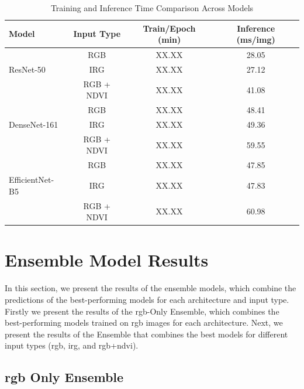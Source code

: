 \begin{table}[H]
    \centering
    \renewcommand{\arraystretch}{1.2}
    \setlength{\tabcolsep}{12pt}
    \begin{tabular}{@{}lccc@{}}
        \toprule
        \textbf{Model} & \textbf{Input Type} & \textbf{Train/Epoch (min)} & \textbf{Inference (ms/img)} \\ \midrule
        & RGB             & XX.XX & 28.05 \\
        ResNet-50       & IRG             & XX.XX & 27.12 \\
        & RGB + NDVI      & XX.XX & 41.08 \\
        
        \midrule
        
        & RGB             & XX.XX & 48.41 \\
        DenseNet-161    & IRG             & XX.XX & 49.36 \\
        & RGB + NDVI      & XX.XX & 59.55 \\
        
        \midrule
        
        & RGB             & XX.XX & 47.85 \\
        EfficientNet-B5 & IRG             & XX.XX & 47.83 \\
        & RGB + NDVI      & XX.XX & 60.98 \\
        \bottomrule
    \end{tabular}
    \caption{Training and Inference Time Comparison Across Models}
    \label{tab:training_times}
\end{table}


\section{Ensemble Model Results}

In this section, we present the results of the ensemble models, which combine the predictions of
the best-performing models for each architecture and input type. Firstly we present the results of the
\gls{rgb}-Only Ensemble, which combines the best-performing models trained on \gls{rgb} images for each architecture.
Next, we present the results of the Ensemble that combines the best models for different input
types (\gls{rgb}, \gls{irg}, and \gls{rgb}+\gls{ndvi}).

\subsection{\gls{rgb} Only Ensemble}

